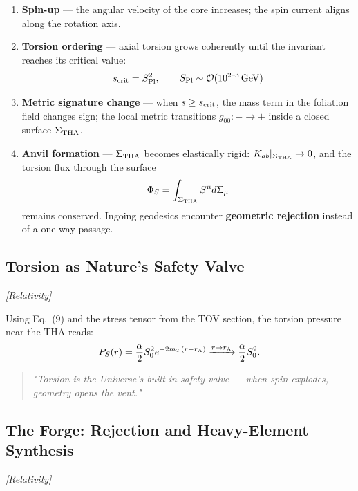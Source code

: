 \documentclass{article}
\newcommand{\Splanck}{\ensuremath{S_{\mathrm{Pl}}}}
\newcommand{\grtag}{\textcolor{blue!40!black}{\textit{[Relativity]}}}
\begin{document}
\begin{enumerate}[label=\textbf{Step \arabic*}, wide]
  \item \textbf{Spin-up} --- the angular velocity of the core increases; the spin current aligns along the rotation axis.
  \item \textbf{Torsion ordering} --- axial torsion grows coherently until the invariant reaches its critical value:
  \begin{equation}
s_{\rm crit} = \Splanck^2,
\qquad
\Splanck \sim \mathcal{O}(10^{2\text{--}3}\,\mathrm{GeV})
\label{eq:THF-scrit}
\end{equation}

  \item \textbf{Metric signature change} --- when $s \geq s_{\rm crit}$, the mass term in the foliation field changes sign; the local metric transitions $g_{00}\!: - \rightarrow +$ inside a closed surface $\Sigma_{\rm THA}$.
  \item \textbf{Anvil formation} --- $\Sigma_{\rm THA}$ becomes elastically rigid: $K_{ab}|_{\Sigma_{\rm THA}} \rightarrow 0$, and the torsion flux through the surface
  \begin{equation}
    \Phi_{S} = \int_{\Sigma_{\rm THA}} S^{\mu} d\Sigma_{\mu}
  \end{equation}
  remains conserved. Ingoing geodesics encounter \textbf{geometric rejection} instead of a one-way passage.
\end{enumerate}

\subsection{Torsion as Nature's Safety Valve}
\label{subsec:THF-valve}
\grtag
    
Using Eq.~(9) and the stress tensor from the TOV section, the torsion pressure near the THA reads:
\begin{equation}
  P_{S}(r) = \frac{\alpha}{2} S_{0}^{2} e^{-2m_{T}(r - r_{\rm A})} \xrightarrow{r \to r_{\rm A}} \frac{\alpha}{2} S_{0}^{2}.
\end{equation}

\begin{quotation}
\centering
\textit{"Torsion is the Universe's built-in safety valve --- when spin explodes, geometry opens the vent."}
\end{quotation}

\subsection{The Forge: Rejection and Heavy-Element Synthesis}
\label{subsec:THF-forge}
\grtag
\end{document}
